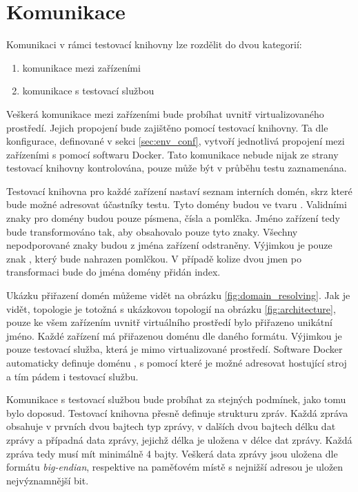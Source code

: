 \section{Komunikace}

Komunikaci v rámci testovací knihovny lze rozdělit do dvou kategorií:

\begin{enumerate}
    \item komunikace mezi zařízeními
    \item komunikace s testovací službou
\end{enumerate}

Veškerá komunikace mezi zařízeními bude probíhat uvnitř virtualizovaného prostředí. Jejich propojení bude zajištěno pomocí testovací knihovny. Ta dle konfigurace, definované v sekci \ref{sec:env_conf}, vytvoří jednotlivá propojení mezi zařízeními s pomocí softwaru Docker. Tato komunikace nebude nijak ze strany testovací knihovny kontrolována, pouze může být v průběhu testu zaznamenána. 

Testovací knihovna pro každé zařízení nastaví seznam interních domén, skrz které bude možné adresovat účastníky testu. Tyto domény budou ve tvaru . Validními znaky pro domény budou pouze písmena, čísla a pomlčka. Jméno zařízení tedy bude transformováno tak, aby obsahovalo pouze tyto znaky. Všechny nepodporované znaky budou z jména zařízení odstraněny. Výjimkou je pouze znak , který bude nahrazen pomlčkou. V případě kolize dvou jmen po transformaci bude do jména domény přidán index. 

Ukázku přiřazení domén můžeme vidět na obrázku \ref{fig:domain_resolving}. Jak je vidět, topologie je totožná s ukázkovou topologií na obrázku \ref{fig:architecture}, pouze ke všem zařízením uvnitř virtuálního prostředí bylo přiřazeno unikátní jméno. Každé zařízení má přiřazenou doménu dle daného formátu. Výjimkou je pouze testovací služba, která je mimo virtualizované prostředí. Software Docker automaticky definuje doménu , s pomocí které je možné adresovat hostující stroj a tím pádem i testovací službu.

Komunikace s testovací službou bude probíhat za stejných podmínek, jako tomu bylo doposud. Testovací knihovna přesně definuje strukturu zpráv. Každá zpráva obsahuje v prvních dvou bajtech typ zprávy, v dalších dvou bajtech délku dat zprávy a případná data zprávy, jejichž délka je uložena v délce dat zprávy. Každá zpráva tedy musí mít minimálně 4 bajty. Veškerá data zprávy jsou uložena dle formátu \textit{big-endian}, respektive na paměťovém místě s nejnižší adresou je uložen nejvýznamnější bit.

